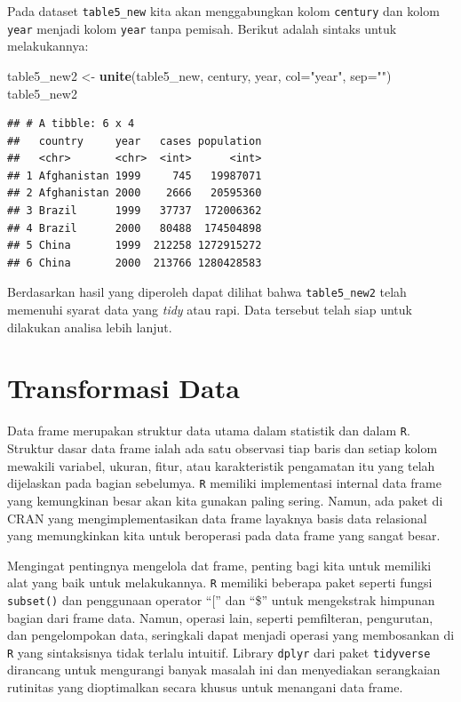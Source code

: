 \documentclass[]{book}
\newenvironment{Shaded}{\begin{snugshade}}{\end{snugshade}}
\newcommand{\KeywordTok}[1]{\textcolor[rgb]{0.13,0.29,0.53}{\textbf{#1}}}
\newcommand{\DataTypeTok}[1]{\textcolor[rgb]{0.13,0.29,0.53}{#1}}
\newcommand{\StringTok}[1]{\textcolor[rgb]{0.31,0.60,0.02}{#1}}
\newcommand{\NormalTok}[1]{#1}
\begin{document}
Pada dataset \texttt{table5\_new} kita akan menggabungkan kolom
\texttt{century} dan kolom \texttt{year} menjadi kolom \texttt{year}
tanpa pemisah. Berikut adalah sintaks untuk melakukannya:

\begin{Shaded}
\begin{Highlighting}[]
\NormalTok{table5_new2 <-}\StringTok{ }\KeywordTok{unite}\NormalTok{(table5_new, century,}
\NormalTok{                    year, }\DataTypeTok{col=}\StringTok{"year"}\NormalTok{, }\DataTypeTok{sep=}\StringTok{""}\NormalTok{)}
\NormalTok{table5_new2}
\end{Highlighting}
\end{Shaded}

\begin{verbatim}
## # A tibble: 6 x 4
##   country     year   cases population
##   <chr>       <chr>  <int>      <int>
## 1 Afghanistan 1999     745   19987071
## 2 Afghanistan 2000    2666   20595360
## 3 Brazil      1999   37737  172006362
## 4 Brazil      2000   80488  174504898
## 5 China       1999  212258 1272915272
## 6 China       2000  213766 1280428583
\end{verbatim}

Berdasarkan hasil yang diperoleh dapat dilihat bahwa
\texttt{table5\_new2} telah memenuhi syarat data yang \emph{tidy} atau
rapi. Data tersebut telah siap untuk dilakukan analisa lebih lanjut.

\section{Transformasi Data}\label{transformasi-data}

Data frame merupakan struktur data utama dalam statistik dan dalam
\texttt{R}. Struktur dasar data frame ialah ada satu observasi tiap
baris dan setiap kolom mewakili variabel, ukuran, fitur, atau
karakteristik pengamatan itu yang telah dijelaskan pada bagian
sebelumya. \texttt{R} memiliki implementasi internal data frame yang
kemungkinan besar akan kita gunakan paling sering. Namun, ada paket di
CRAN yang mengimplementasikan data frame layaknya basis data relasional
yang memungkinkan kita untuk beroperasi pada data frame yang sangat
besar.

Mengingat pentingnya mengelola dat frame, penting bagi kita untuk
memiliki alat yang baik untuk melakukannya. \texttt{R} memiliki beberapa
paket seperti fungsi \texttt{subset()} dan penggunaan operator ``{[}''
dan ``\$'' untuk mengekstrak himpunan bagian dari frame data. Namun,
operasi lain, seperti pemfilteran, pengurutan, dan pengelompokan data,
seringkali dapat menjadi operasi yang membosankan di \texttt{R} yang
sintaksisnya tidak terlalu intuitif. Library \texttt{dplyr} dari paket
\texttt{tidyverse} dirancang untuk mengurangi banyak masalah ini dan
menyediakan serangkaian rutinitas yang dioptimalkan secara khusus untuk
menangani data frame.
\end{document}
